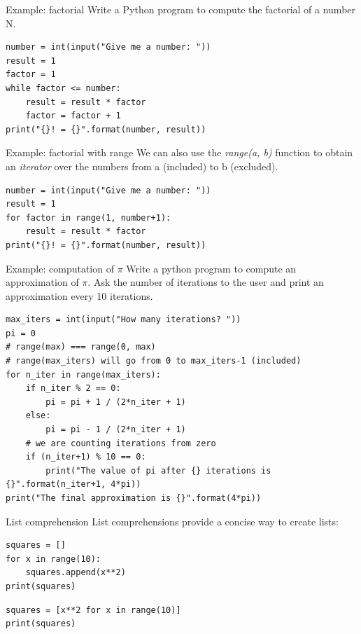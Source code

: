 \documentclass[aspectratio=169,handout]{beamer}
\begin{document}
\begin{frame}[fragile]{Example: factorial}
    Write a Python program to compute the factorial of a number N.
    \pause

    \begin{verbatim}
number = int(input("Give me a number: "))
result = 1
factor = 1
while factor <= number:
    result = result * factor
    factor = factor + 1
print("{}! = {}".format(number, result))
    \end{verbatim}
\end{frame}

\begin{frame}[fragile]{Example: factorial with range}
    We can also use the \emph{range(a, b)} function to obtain an \emph{iterator} over the numbers from a (included) to b
    (excluded).
    \begin{verbatim}
number = int(input("Give me a number: "))
result = 1
for factor in range(1, number+1):
    result = result * factor
print("{}! = {}".format(number, result))
    \end{verbatim}
\end{frame}

\begin{frame}[fragile]{Example: computation of $\pi$}
    Write a python program to compute an approximation of $\pi$.
    Ask the number of iterations to the user and print an approximation every 10 iterations.

    \pause
    \begin{verbatim}
max_iters = int(input("How many iterations? "))
pi = 0
# range(max) === range(0, max)
# range(max_iters) will go from 0 to max_iters-1 (included)
for n_iter in range(max_iters):
    if n_iter % 2 == 0:
        pi = pi + 1 / (2*n_iter + 1)
    else:
        pi = pi - 1 / (2*n_iter + 1)
    # we are counting iterations from zero
    if (n_iter+1) % 10 == 0:
        print("The value of pi after {} iterations is {}".format(n_iter+1, 4*pi))
print("The final approximation is {}".format(4*pi))
    \end{verbatim}
\end{frame}

\begin{frame}[fragile]{List comprehension}
    List comprehensions provide a concise way to create lists:

    \begin{minipage}{0.49\textwidth}
    \begin{verbatim}
squares = []
for x in range(10):
    squares.append(x**2)
print(squares)
    \end{verbatim}
    \end{minipage}
    \begin{minipage}{0.49\textwidth}
    \begin{verbatim}
squares = [x**2 for x in range(10)]
print(squares)
    \end{verbatim}
    \end{minipage}
\end{frame}
\end{document}
